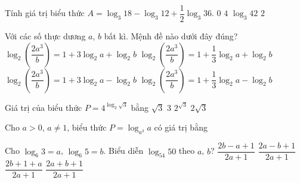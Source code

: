 \begin{ex}%
	Tính giá trị biểu thức $A=\log_3  18-\log_3 12+\dfrac{1}{2}\log_3 36$.
	 \choice
		 {$0$}
		{$4$} 
		{$\log_3 42$} 
		 {\True$2$}
\end{ex}

\begin{ex}%
	Với các số thực dương $a$, $b$ bất kì. Mệnh đề nào dưới đây đúng? 
	\choice 
		{$\log_2\left(\dfrac{2a^3}{b}\right)=1+3\log_2 a+\log_2  b$}
		{$\log_2\left(\dfrac{2a^3}{b}\right)=1+\dfrac{1}{3}\log_2  a+\log_2 b$}
		 {$\log_2\left(\dfrac{2a^3}{b}\right)=1+3\log_2 a-\log_2 b$}
		{$\log_2\left(\dfrac{2a^3}{b}\right)=1+\dfrac{1}{3}\log_2  a-\log_2 b$}
\end{ex}

\begin{ex}%
	Giá trị  của biểu thức $P=4^{\log_2 \sqrt{3}}$ bằng
	\choice 
		 {$\sqrt{3}$}
		 {\True $3$}
		{$2^{\sqrt{3}}$} 
		{$2\sqrt{3}$} 
\end{ex}

\begin{ex}%
	Cho $a>0$, $a \ne 1$, biểu thức $P=\log_{a^3}a$ có giá trị bằng 
\end{ex}

\begin{ex}%
	 Cho $\log_6 3=a$, $\log_6 5=b$. Biểu diễn $\log _{54} 50$ theo $a$, $b$?
	 \choice
		 {\True $\dfrac{2b-a+1}{2a+1}$}
		 {$\dfrac{2a-b+1}{2a+1}$}
		{$\dfrac{2b+1+a}{2a+1}$} 
		{$\dfrac{2a+b+1}{2a+1}$} 
\end{ex}


